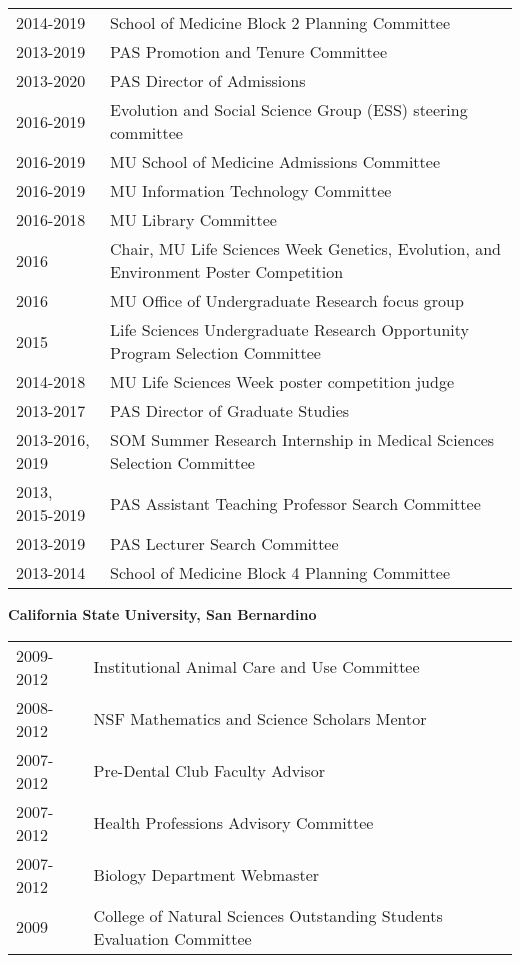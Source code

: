 \documentclass[11pt, a4paper]{awesome-cv}
\begin{document}
\begin{tabular}{ll}
  2014-2019 & School of Medicine Block 2 Planning Committee \\ 
  2013-2019 & PAS Promotion and Tenure Committee \\ 
  2013-2020 & PAS Director of Admissions \\ 
  2016-2019 & Evolution and Social Science Group (ESS) steering committee \\ 
  2016-2019 & MU School of Medicine Admissions Committee \\ 
  2016-2019 & MU Information Technology Committee \\ 
  2016-2018 & MU Library Committee \\ 
  2016 & Chair, MU Life Sciences Week Genetics, Evolution, and Environment Poster Competition \\ 
  2016 & MU Office of Undergraduate Research focus group \\ 
  2015 & Life Sciences Undergraduate Research Opportunity Program Selection Committee \\ 
  2014-2018 & MU Life Sciences Week poster competition judge \\ 
  2013-2017 & PAS Director of Graduate Studies \\ 
  2013-2016, 2019 & SOM Summer Research Internship in Medical Sciences Selection Committee \\ 
  2013, 2015-2019 & PAS Assistant Teaching Professor Search Committee \\ 
  2013-2019 & PAS Lecturer Search Committee \\ 
  2013-2014 & School of Medicine Block 4 Planning Committee \\ 
  \end{tabular}

\textbf{California State University, San Bernardino}

\begin{tabular}{ll}
  2009-2012 & Institutional Animal Care and Use Committee \\ 
  2008-2012 & NSF Mathematics and Science Scholars Mentor \\ 
  2007-2012 & Pre-Dental Club Faculty Advisor \\ 
  2007-2012 & Health Professions Advisory Committee \\ 
  2007-2012 & Biology Department Webmaster \\ 
  2009 & College of Natural Sciences Outstanding Students Evaluation Committee \\ 
  \end{tabular}
\end{document}
